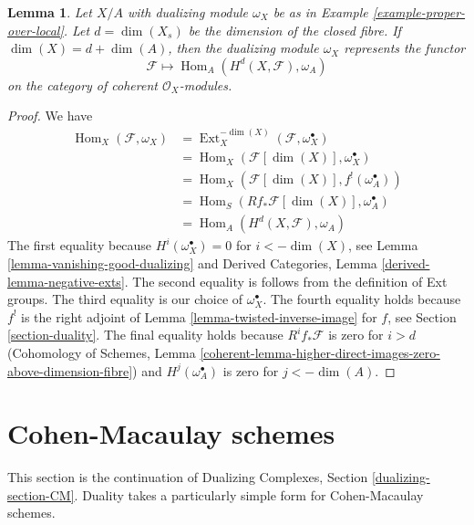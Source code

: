 \documentclass{stacks-project}
\theoremstyle{plain}
\newtheorem{lemma}[subsection]{Lemma}
\theoremstyle{definition}
\theoremstyle{remark}
\numberwithin{equation}{subsection}
\def\Hom{\mathop{\mathrm{Hom}}\nolimits}
\def\Ext{\mathop{\mathrm{Ext}}\nolimits}
\begin{document}
\begin{lemma}
\label{lemma-dualizing-module-proper-over-A}
Let $X/A$ with dualizing module $\omega_X$ be as in
Example \ref{example-proper-over-local}.
Let $d = \dim(X_s)$ be the dimension
of the closed fibre. If $\dim(X) = d + \dim(A)$, then
the dualizing module $\omega_X$ represents the functor
$$
\mathcal{F} \longmapsto \Hom_A(H^d(X, \mathcal{F}), \omega_A)
$$
on the category of coherent $\mathcal{O}_X$-modules.
\end{lemma}

\begin{proof}
We have
\begin{align*}
\Hom_X(\mathcal{F}, \omega_X)
& =
\Ext^{-\dim(X)}_X(\mathcal{F}, \omega_X^\bullet) \\
& =
\Hom_X(\mathcal{F}[\dim(X)], \omega_X^\bullet) \\
& =
\Hom_X(\mathcal{F}[\dim(X)], f^!(\omega_A^\bullet)) \\
& =
\Hom_S(Rf_*\mathcal{F}[\dim(X)], \omega_A^\bullet) \\
& =
\Hom_A(H^d(X, \mathcal{F}), \omega_A)
\end{align*}
The first equality because $H^i(\omega_X^\bullet) = 0$ for
$i < -\dim(X)$, see Lemma \ref{lemma-vanishing-good-dualizing} and
Derived Categories, Lemma \ref{derived-lemma-negative-exts}.
The second equality is follows from the definition of Ext groups.
The third equality is our choice of $\omega_X^\bullet$.
The fourth equality holds because $f^!$ is the
right adjoint of Lemma \ref{lemma-twisted-inverse-image} for
$f$, see Section \ref{section-duality}.
The final equality holds because $R^if_*\mathcal{F}$ is zero
for $i > d$ (Cohomology of Schemes, Lemma
\ref{coherent-lemma-higher-direct-images-zero-above-dimension-fibre})
and $H^j(\omega_A^\bullet)$ is zero for $j < -\dim(A)$.
\end{proof}








\section{Cohen-Macaulay schemes}
\label{section-CM}

\noindent
This section is the continuation of Dualizing Complexes, Section
\ref{dualizing-section-CM}.
Duality takes a particularly simple form for Cohen-Macaulay schemes.
\end{document}
